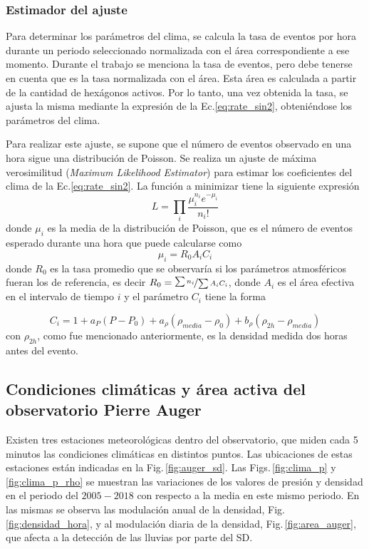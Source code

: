 \subsubsection{Estimador del ajuste}

Para determinar los parámetros del clima, se calcula la tasa de eventos por hora durante un periodo seleccionado normalizada con el área correspondiente a ese momento. Durante el trabajo se menciona la tasa de eventos, pero debe tenerse en cuenta que es la tasa normalizada con el área. Esta área es calculada a partir de la cantidad de hexágonos activos. Por lo tanto, una vez obtenida la tasa, se ajusta la misma mediante la expresión de la Ec.\ref{eq:rate_sin2}, obteniéndose los parámetros del clima.

Para realizar este ajuste, se supone que el número de eventos observado en una hora sigue una distribución de Poisson. Se realiza un ajuste de máxima verosimilitud (\emph{Maximum Likelihood Estimator}) para estimar los coeficientes del clima de la Ec.\ref{eq:rate_sin2}. La función a minimizar tiene la siguiente expresión 
\begin{equation}
	L=\prod_i\frac{\mu_i^{n_i} e^{-\mu_i}}{n_i!}
\end{equation}
donde $\mu_i$ es la media de la distribución de Poisson, que es el número de eventos esperado durante una hora que puede calcularse como
\begin{equation}
	\mu_i = R_0A_iC_i
\end{equation}
donde $R_0$ es la tasa promedio que se observaría si los parámetros atmosféricos fueran los de referencia, es decir $R_0=\nicefrac{\sum n_i}{\sum A_iC_i}$, donde $A_i$ es el área efectiva en el intervalo de tiempo $i$ y el parámetro $C_i$ tiene la forma

\begin{equation}
	C_i = 1+a_P(P-P_0) +a_{\rho}(\rho_{media}-\rho_0) + b_{\rho}(\rho_{2h}-\rho_{media}) 
\end{equation}
con $\rho_{2h}$, como fue mencionado anteriormente, es la densidad medida dos horas antes del evento.

\subsection{Condiciones climáticas y área activa del observatorio Pierre Auger}

Existen tres estaciones meteorológicas dentro del observatorio, que miden cada 5 minutos las condiciones climáticas en distintos puntos. Las ubicaciones de estas estaciones están indicadas en la Fig.\,\ref{fig:auger_sd}. Las Figs.\,\ref{fig:clima_p} y \ref{fig:clima_p_rho} se muestran las variaciones de los valores de presión y densidad en el periodo del $2005-2018$ con respecto a la media en este mismo periodo. En las mismas se observa las modulación anual de la densidad, Fig.\,\ref{fig:densidad_hora}, y al modulación diaria de la densidad, Fig.\,\ref{fig:area_auger}, que afecta a la detección de las lluvias por parte del SD. 

